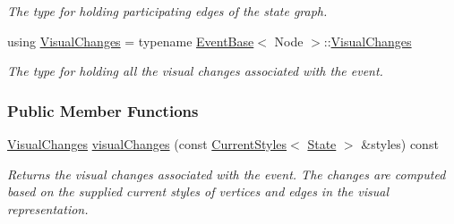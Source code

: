 \begin{DoxyCompactItemize}
\begin{DoxyCompactList}\small\item\em The type for holding participating edges of the state graph. \end{DoxyCompactList}\item 
using \hyperlink{structUniformChange_a5495e5c502128ddee0fae776e4793632}{Visual\+Changes} = typename \hyperlink{structEventBase}{Event\+Base}$<$ Node $>$\+::\hyperlink{structUniformChange_a5495e5c502128ddee0fae776e4793632}{Visual\+Changes}\hypertarget{structUniformChange_a5495e5c502128ddee0fae776e4793632}{}\label{structUniformChange_a5495e5c502128ddee0fae776e4793632}

\begin{DoxyCompactList}\small\item\em The type for holding all the visual changes associated with the event. \end{DoxyCompactList}\end{DoxyCompactItemize}
\subsubsection*{Public Member Functions}
\begin{DoxyCompactItemize}
\item 
\hyperlink{structUniformChange_a5495e5c502128ddee0fae776e4793632}{Visual\+Changes} \hyperlink{structUniformChange_a5501ba4ef1cab1b1d84b574f85756744}{visual\+Changes} (const \hyperlink{structCurrentStyles}{Current\+Styles}$<$ \hyperlink{structEventBase_a174eb2c38ec68481b21f78db338e834c}{State} $>$ \&styles) const 
\begin{DoxyCompactList}\small\item\em Returns the visual changes associated with the event. The changes are computed based on the supplied current styles of vertices and edges in the visual representation. \end{DoxyCompactList}\end{DoxyCompactItemize}

